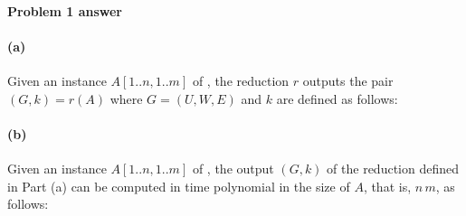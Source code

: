 

\newpage

\paragraph{Problem 1 answer}


\paragraph{(a)}


Given an instance $A[1..n, 1..m]$ of ,
the reduction $r$ outputs the pair $(G, k) = r(A)$ where
$G=(U,W,E)$ and $k$ are defined as follows:

\begin{blue}
  \REPLACEME
\end{blue}


\paragraph{(b)}  


Given an instance $A[1..n, 1..m]$ of , the output $(G, k)$
of the reduction defined in Part (a) can be computed in time polynomial in the size of $A$, that is, $n\,m$, as follows:

\begin{blue}
  \REPLACEME
\end{blue}

